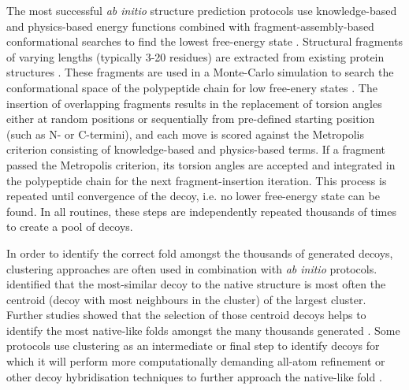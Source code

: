 The most successful \textit{ab initio} structure prediction protocols use knowledge-based and physics-based energy functions combined with fragment-assembly-based conformational searches to find the lowest free-energy state \cite{Rohl2004-dj,Xu2012-jf,Blaszczyk2013-nx,Kosciolek2014-bt,De_Oliveira2017-sg}. Structural fragments of varying lengths (typically 3-20 residues) are extracted from existing protein structures \cite{Abbass2015-qk,Shen2013-wh,Li2008-xu,Kalev2011-sz,Bhattacharya2016-ix,Wang2017-ka,De_Oliveira2015-kb,Gront2011-sv}. These fragments are used in a Monte-Carlo simulation to search the conformational space of the polypeptide chain for low free-enery states \cite{Metropolis1949-kp}. The insertion of overlapping fragments results in the replacement of torsion angles either at random positions or sequentially from pre-defined starting position (such as N- or C-termini), and each move is scored against the Metropolis criterion \cite{Metropolis1949-kp} consisting of knowledge-based and physics-based terms. If a fragment passed the Metropolis criterion, its torsion angles are accepted and integrated in the polypeptide chain for the next fragment-insertion iteration. This process is repeated until convergence of the decoy, i.e. no lower free-energy state can be found. In all routines, these steps are independently repeated thousands of times to create a pool of decoys. 

In order to identify the correct fold amongst the thousands of generated decoys, clustering approaches are often used in combination with \textit{ab initio} protocols. \textcite{Shortle1998-fq} identified that the most-similar decoy to the native structure is most often the centroid (decoy with most neighbours in the cluster) of the largest cluster. Further studies showed that the selection of those centroid decoys helps to identify the most native-like folds amongst the many thousands generated \cite{Zhang2004-uz,Bradley2005-lw,Oldziej2005-qp}. Some protocols use clustering as an intermediate or final step to identify decoys for which it will perform more computationally demanding all-atom refinement \cite{Bradley2005-lw} or other decoy hybridisation techniques \cite{Zhang2004-uc,Xu2012-jf,Yang2015-oc} to further approach the native-like fold \cite{Kryshtafovych2016-aq}.

